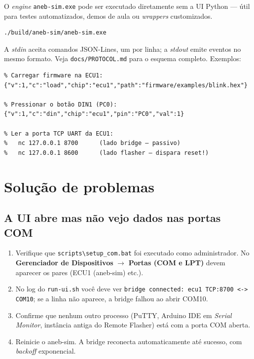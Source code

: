 \documentclass[12pt,a4paper]{article}
\begin{document}
O \emph{engine} \texttt{aneb-sim.exe} pode ser executado diretamente
sem a UI Python --- útil para testes automatizados, demos de aula ou
\emph{wrappers} customizados.

\begin{lstlisting}[language=bash]
./build/aneb-sim/aneb-sim.exe
\end{lstlisting}

A \emph{stdin} aceita comandos JSON-Lines, um por linha; a
\emph{stdout} emite eventos no mesmo formato. Veja
\texttt{docs/PROTOCOL.md} para o esquema completo. Exemplos:

\begin{lstlisting}
% Carregar firmware na ECU1:
{"v":1,"c":"load","chip":"ecu1","path":"firmware/examples/blink.hex"}

% Pressionar o botão DIN1 (PC0):
{"v":1,"c":"din","chip":"ecu1","pin":"PC0","val":1}

% Ler a porta TCP UART da ECU1:
%   nc 127.0.0.1 8700      (lado bridge — passivo)
%   nc 127.0.0.1 8600      (lado flasher — dispara reset!)
\end{lstlisting}

\section{Solução de problemas}

\subsection{A UI abre mas não vejo dados nas portas COM}

\begin{enumerate}[nosep]
  \item Verifique que \texttt{scripts\textbackslash setup\_com.bat}
        foi executado como administrador. No \textbf{Gerenciador de
        Dispositivos} $\rightarrow$ \textbf{Portas (COM e LPT)} devem aparecer
        os pares (ECU1 (aneb-sim) etc.).
  \item No log do \texttt{run-ui.sh} você deve ver
        \texttt{bridge connected: ecu1 TCP:8700 <-> COM10}; se a
        linha não aparece, a bridge falhou ao abrir COM10.
  \item Confirme que nenhum outro processo (PuTTY, Arduino IDE em
        \emph{Serial Monitor}, instância antiga do Remote Flasher)
        está com a porta COM aberta.
  \item Reinicie o aneb-sim. A bridge reconecta automaticamente até
        sucesso, com \emph{backoff} exponencial.
\end{enumerate}
\end{document}
